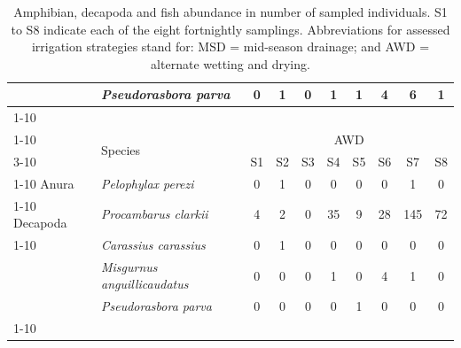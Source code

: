 \begin{table} [htbp]
\begin{tabular}{l | l | c c c c c c c c }
& \textit{Pseudorasbora parva} & 0 & 1 & 0 & 1 & 1 & 4 & 6 & 1\\
    \cline{1-10} 
\multicolumn{10}{c}{} \\
     \cline{1-10}
\multirow{2}{2.3cm}{Order} & \multirow{2}{3cm}{Species} & \multicolumn{8}{c}{AWD} \\
    \cline{3-10}
& & S1 & S2 & S3 & S4 & S5 & S6 & S7 & S8 \\
    \cline{1-10}
Anura & \textit{Pelophylax perezi} & 0 & 1 & 0 & 0 & 0 & 0 & 1 & 0\\
    \cline{1-10}
Decapoda & \textit{Procambarus clarkii} & 4 & 2 & 0 & 35 & 9 & 28 & 145 & 72\\
    \cline{1-10}
\multirow{3}{2.3cm}{Cypriniformes} & \textit{Carassius carassius} & 0 & 1 & 0 & 0 & 0 & 0 & 0 & 0\\
  & \textit{Misgurnus anguillicaudatus} & 0 & 0 & 0 & 1 & 0 & 4 & 1 & 0\\
& \textit{Pseudorasbora parva} & 0 & 0 & 0 & 0 & 1 & 0 & 0 & 0\\
\cline{1-10}
    \end{tabular}
    \caption[Amphibian, decapoda and fish abundance]{Amphibian, decapoda and fish abundance in number of sampled individuals. S1 to S8 indicate each of the eight fortnightly samplings. Abbreviations for assessed irrigation strategies stand for: MSD = mid-season drainage; and AWD = alternate wetting and drying.}
    \label{AbuMacroFauna}
\end{table}


